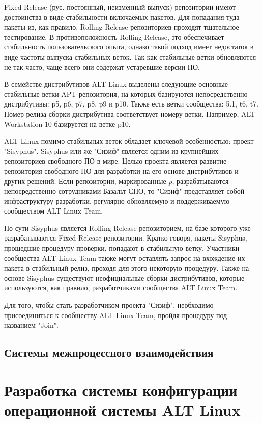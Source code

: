 \documentclass[bachelor, och, pract]{SCWorks}
\begin{document}
Fixed Release (рус. постоянный, неизменный выпуск) репозитории имеют достоинства в виде стабильности включаемых пакетов.
Для попадания туда пакеты из, как правило, Rolling Release репозиториев проходят тщательное тестирование.
В противоположность Rolling Release, это обеспечивает стабильность пользовательского опыта, однако такой подход имеет недостаток в виде частоты выпуска стабильных веток.
Так как стабильные ветки обновляются не так часто, чаще всего они содержат устаревшие версии ПО.

В семействе дистрибутивов ALT Linux выделены следующие основные стабильные ветки APT-репозитория, на которых базируются непосредственно дистрибутивы: p5, p6, p7, p8, p9 и p10.
Также есть ветки сообщества: 5.1, t6, t7. Номер релиза сборки дистрибутива соответствует номеру ветки.
Например, ALT Workstation 10 базируется на ветке p10.

ALT Linux помимо стабильных веток обладает ключевой особенностью: проект "Sisyphus".
Sisyphus или же "Сизиф" является одним из крупнейших репозиториев свободного ПО в мире.
Целью проекта является развитие репозитория свободного ПО для разработки на его основе дистрибутивов и других решений.
Если репозитории, маркированные \textit{p}, разрабатываются непосредственно сотрудниками Базальт СПО, то "Сизиф" представляет собой инфраструктуру разработки,
регулярно обновляемую и поддерживаемую сообществом ALT Linux Team.

По сути Sisyphus является Rolling Release репозиторием, на базе которого уже разрабатываются Fixed Release репозитории.
Кратко говоря, пакеты Sisyphus, прошедшие процедуру проверки, попадают в стабильную ветку.
Участники сообщества ALT Linux Team также могут оставлять запрос на вхождение их пакета в стабильный релиз, проходя для этого некоторую процедуру.
Также на основе Sisyphus существуют неофициальные сборки дистрибутивов, которые используются, как правило, разработчиками сообщества ALT Linux Team.

Для того, чтобы стать разработчиком проекта "Сизиф", необходимо присоединиться к сообществу ALT Linux Team, пройдя процедуру под названием "Join".


\subsection{Системы межпроцессного взаимодействия}

\newpage

\section{Разработка системы конфигурации операционной системы ALT Linux}
\end{document}
